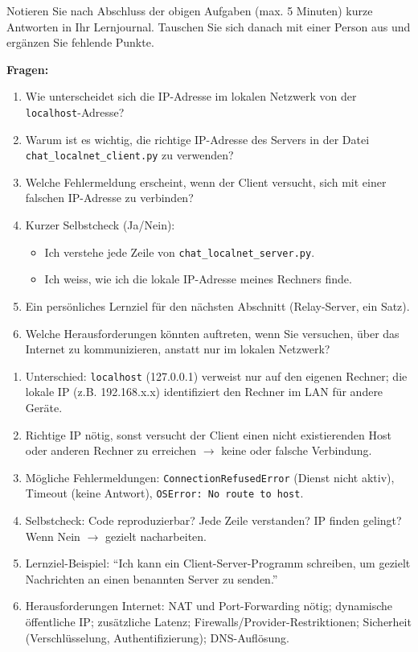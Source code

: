 \begin{myexercise}[Reflexionsfragen]
    Notieren Sie nach Abschluss der obigen Aufgaben (max. 5 Minuten) kurze Antworten in Ihr Lernjournal. Tauschen Sie sich danach mit einer Person aus und ergänzen Sie fehlende Punkte.

    \textbf{Fragen:}
    \begin{enumerate}
        \item Wie unterscheidet sich die \gls{IP}-Adresse im lokalen Netzwerk von der \texttt{localhost}-Adresse?
        \item Warum ist es wichtig, die richtige \gls{IP}-Adresse des Servers in der Datei \texttt{chat\_localnet\_\allowbreak client.py} zu verwenden?
        \item Welche Fehlermeldung erscheint, wenn der Client versucht, sich mit einer falschen \gls{IP}-Adresse zu verbinden?
        \item Kurzer Selbstcheck (Ja/Nein):
              \begin{itemize}
                  \item Ich verstehe jede Zeile von \texttt{chat\_localnet\_server.py}.
                  \item Ich weiss, wie ich die lokale \gls{IP}-Adresse meines Rechners finde.
              \end{itemize}
        \item Ein persönliches Lernziel für den nächsten Abschnitt (Relay-Server, ein Satz).
        \item Welche Herausforderungen könnten auftreten, wenn Sie versuchen, über das Internet zu kommunizieren, anstatt nur im lokalen Netzwerk?
    \end{enumerate}
    \begin{myanswer}
        \begin{enumerate}
            \item Unterschied: \texttt{localhost} (127.0.0.1) verweist nur auf den eigenen Rechner; die lokale \gls{IP} (z.B. 192.168.x.x) identifiziert den Rechner im \gls{LAN} für andere Geräte.
            \item Richtige \gls{IP} nötig, sonst versucht der Client einen nicht existierenden Host oder anderen Rechner zu erreichen $\rightarrow$ keine oder falsche Verbindung.
            \item Mögliche Fehlermeldungen: \texttt{ConnectionRefusedError} (Dienst nicht aktiv), Timeout (keine Antwort), \texttt{OSError: No route to host}.
            \item Selbstcheck: Code reproduzierbar? Jede Zeile verstanden? \acrshort{IP} finden gelingt? Wenn Nein $\rightarrow$ gezielt nacharbeiten.
            \item Lernziel-Beispiel: \enquote{Ich kann ein Client-Server-Programm schreiben, um gezielt Nachrichten an einen benannten Server zu senden.}
            \item Herausforderungen Internet: \gls{NAT} und Port-Forwarding nötig; dynamische öffentliche \acrshort{IP}; zusätzliche Latenz; Firewalls/Provider-Restriktionen; Sicherheit (Verschlüsselung, Authentifizierung); \gls{DNS}-Auflösung.
        \end{enumerate}
    \end{myanswer}


\end{myexercise}
